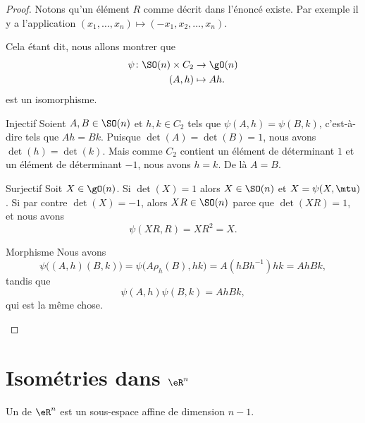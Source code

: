 \begin{proof}
	Notons qu'un élément \( R\) comme décrit dans l'énoncé existe. Par exemple il y a l'application  \( (x_1,\ldots, x_n)\mapsto (-x_1,x_2,\ldots, x_n)\).

	Cela étant dit, nous allons montrer que
	\begin{equation}
		\begin{aligned}
			\psi\colon \SO(n)\times C_2 & \to \gO(n)  \\
			(A,h)                       & \mapsto Ah.
		\end{aligned}
	\end{equation}
	est un isomorphisme.
	\begin{subproof}
		\item[Injectif]
		Soient \( A,B\in \SO(n)\) et \( h,k\in C_2\) tels que \( \psi(A,h)=\psi(B,k)\), c'est-à-dire tels que \( Ah=Bk\). Puisque \( \det(A)=\det(B)=1\), nous avons \( \det(h)=\det(k)\). Mais comme \( C_2\) contient un élément de déterminant \( 1\) et un élément de déterminant \( -1\), nous avons \( h=k\). De là \( A=B\).
		\item[Surjectif]
		Soit \( X\in\gO(n)\). Si \( \det(X)=1\) alors \( X\in \SO(n)\) et \( X=\psi(X,\mtu)\). Si par contre \( \det(X)=-1\), alors \( XR\in\SO(n)\) parce que \( \det(XR)=1\), et nous avons
		\begin{equation}
			\psi(XR,R)=XR^2=X.
		\end{equation}
		\item[Morphisme]
		Nous avons
		\begin{equation}
			\psi\Big( (A,h)(B,k) \Big)=\psi\big( A\rho_h(B),hk \big)=A(hBh^{-1})hk=AhBk,
		\end{equation}
		tandis que
		\begin{equation}
			\psi(A,h)\psi(B,k)=AhBk,
		\end{equation}
		qui est la même chose.
	\end{subproof}
\end{proof}

\section{Isométries dans $\eR^n$}

\begin{definition}
	Un  de \( \eR^n\) est un sous-espace affine de dimension \( n-1\).
\end{definition}

